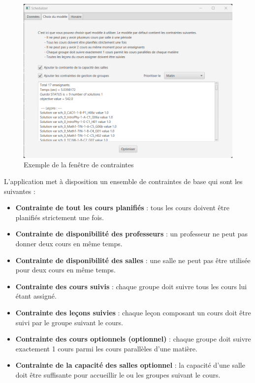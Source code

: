 \begin{figure}[H]
    \centering
    \includegraphics[width=1\textwidth]{./assets/figures/constraintsWindow.png}
    \caption{Exemple de la fenêtre de contraintes}
\end{figure}
\vspace{\baselineskip}

L'application met à disposition un ensemble de contraintes de base qui sont les suivantes :
\begin{itemize}
    \item \textbf{Contrainte de tout les cours planifiés} : tous les cours doivent être planifiés strictement une fois.
    \item \textbf{Contrainte de disponibilité des professeurs} : un professeur ne peut pas donner deux cours en même temps.
    \item \textbf{Contrainte de disponibilité des salles} : une salle ne peut pas être utilisée pour deux cours en même temps.
    \item \textbf{Contrainte des cours suivis} : chaque groupe doit suivre tous les cours lui étant assigné.
    \item \textbf{Contrainte des leçons suivies} : chaque leçon composant un cours doit être suivi par le groupe suivant le cours.
    \item \textbf{Contrainte des cours optionnels (optionnel)} : chaque groupe doit suivre exactement 1 cours parmi les cours parallèles d'une matière.
    \item \textbf{Contrainte de la capacité des salles {optionnel}} : la capacité d'une salle doit être suffisante pour accueillir le ou les groupes suivant le cours.
\end{itemize}
\vspace{\baselineskip}

